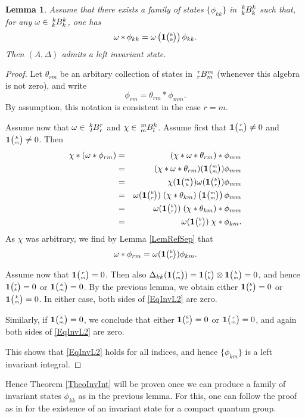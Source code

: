 \documentclass[11pt]{article}
\newcommand{\Grt}[3]{#1{\tiny {\begin{pmatrix} #2\\#3\end{pmatrix}}}}
\newcommand{\UnitC}[2]{\Grt{\mathbf{1}}{#1}{#2}}
\newcommand{\Gr}[5]{\,\tensor*[^{#2}_{#4}]{#1}{^{#3}_{#5}}}%
\newtheorem{Lem}[Theorem]{Lemma}
\theoremstyle{definition}
\numberwithin{equation}{section}
\begin{document}
\begin{Lem} Assume that there exists a family of states $\{\phi_{kk}\}$ in $\Gr{B}{k}{k}{k}{k}$ such that, for any $\omega \in \Gr{B}{k}{k}{k}{k}$, one has \[\omega*\phi_{kk} = \omega\left(\UnitC{k}{k}\right)\phi_{kk}.\] Then $(A,\Delta)$ admits a left invariant state.
\end{Lem}
\begin{proof} Let $\theta_{rm}$ be an arbitary collection of states in $\Gr{B}{r}{m}{r}{m}$ (whenever this algebra is not zero), and write \[\phi_{rm} = \theta_{rm}*\phi_{mm}.\] By assumption, this notation is consistent in the case $r=m$. 

Assume now that $\omega \in \Gr{B}{k}{r}{l}{r}$ and $\chi \in \Gr{B}{m}{k}{m}{l}$. Assume first that $\UnitC{r}{m}\neq 0$ and $\UnitC{k}{m}\neq 0$. Then \begin{eqnarray*} \chi*(\omega*\phi_{rm}) &=& (\chi*\omega*\theta_{rm})*\phi_{mm} \\ &=&  (\chi*\omega*\theta_{rm})(\UnitC{m}{m}) \phi_{mm} \\ &=&  \chi(\UnitC{m}{k})\omega(\UnitC{k}{r})\phi_{mm} \\ &=&  \omega(\UnitC{k}{r}) \; (\chi*\theta_{km})\left(\UnitC{m}{m}\right)\phi_{mm}
\\ &=& \omega(\UnitC{k}{r}) \; (\chi*\theta_{km})*\phi_{mm} \\ &=&  \omega(\UnitC{k}{r}) \; \chi*\phi_{km} .\end{eqnarray*} As $\chi$ was arbitrary, we find by Lemma \ref{LemRefSep} that \begin{equation}\label{EqInvL2} \omega*\phi_{rm} =  \omega(\UnitC{k}{r}) \phi_{km}.\end{equation}

Assume now that $\UnitC{r}{m}=0$. Then also $\Delta_{kk}(\UnitC{r}{m}) = \UnitC{r}{k}\otimes \UnitC{k}{m}=0$, and hence $\UnitC{r}{k}=0$ or $\UnitC{k}{m}=0$. By the previous lemma, we obtain either $\UnitC{k}{r}=0$ or $\UnitC{k}{m}=0$. In either case, both sides of \eqref{EqInvL2} are zero. 

Similarly, if $\UnitC{k}{m}=0$, we conclude that either $\UnitC{k}{r}=0$ or $\UnitC{r}{m}=0$, and again both sides of \eqref{EqInvL2} are zero.

This shows that \eqref{EqInvL2} holds for all indices, and hence $\{\phi_{km}\}$ is a left invariant integral. 
\end{proof} 

Hence Theorem \ref{TheoInvInt} will be proven once we can produce a family of invariant states $\phi_{kk}$ as in the previous lemma. For this, one can follow the proof as in \cite{MVD1} for the existence of an invariant state for a compact quantum group.
\end{document}
